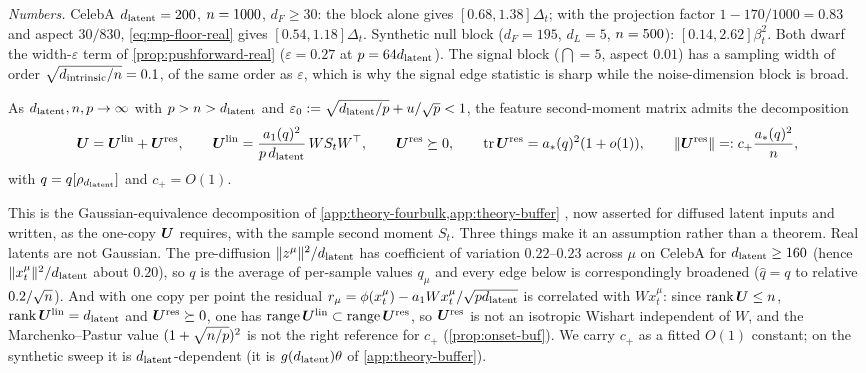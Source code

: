\emph{Numbers.} CelebA $d_{\mathrm{latent}}=200$, $n=1000$, $d_F\ge30$: the block alone gives $[0.68,1.38]\Delta_t$; with the projection factor $1-170/1000=0.83$ and aspect $30/830$, \eqref{eq:mp-floor-real} gives $[0.54,1.18]\Delta_t$. Synthetic null block ($d_F=195$, $d_L=5$, $n=500$): $[0.14,2.62]\beta_t^2$. Both dwarf the width-$\varepsilon$ term of \cref{prop:pushforward-real} ($\varepsilon=0.27$ at $p=64d_{\mathrm{latent}}$). The signal block ($\dint=5$, aspect $0.01$) has a sampling width of order $\sqrt{d_{\mathrm{intrinsic}}/n}=0.1$, of the same order as $\varepsilon$, which is why the signal edge statistic is sharp while the noise-dimension block is broad.

\begin{assumption}\label{assump:gep-real}
As $d_{\mathrm{latent}},n,p\to\infty$ with $p>n>d_{\mathrm{latent}}$ and $\varepsilon_0:=\sqrt{d_{\mathrm{latent}}/p}+u/\sqrt{p}<1$, the feature second-moment matrix admits the decomposition
\begin{equation}\label{eq:Usplit-real}
\bm{U}=\bm{U}^{\mathrm{lin}}+\bm{U}^{\mathrm{res}},\qquad
\bm{U}^{\mathrm{lin}}=\frac{a_1(q)^2}{p\,d_{\mathrm{latent}}}\,WS_tW^\top,\qquad \bm{U}^{\mathrm{res}}\succeq0,\qquad
\operatorname{tr}\bm{U}^{\mathrm{res}}=a_\ast(q)^2(1+o(1)),\qquad \|\bm{U}^{\mathrm{res}}\|=:c_+\frac{a_\ast(q)^2}{n},
\end{equation}
with $q=q[\rho_{d_{\mathrm{latent}}}]$ and $c_+=O(1)$.
\end{assumption}
This is the Gaussian-equivalence decomposition of \cref{app:theory-fourbulk,app:theory-buffer} \citep{bonnaire2025,goldt2022gaussian,hu2022universality,mei2022generalization}, now asserted for diffused latent inputs and written, as the one-copy $\bm{U}$ requires, with the sample second moment $S_t$. Three things make it an assumption rather than a theorem. Real latents are not Gaussian. The pre-diffusion $\|z^\mu\|^2/d_{\mathrm{latent}}$ has coefficient of variation $0.22$--$0.23$ across $\mu$ on CelebA for $d_{\mathrm{latent}}\ge160$ (hence $\|x_t^\mu\|^2/d_{\mathrm{latent}}$ about $0.20$), so $q$ is the average of per-sample values $q_\mu$ and every edge below is correspondingly broadened ($\hat q=q$ to relative $0.2/\sqrt{n}$). And with one copy per point the residual $r_\mu=\phi(x_t^\mu)-a_1Wx_t^\mu/\sqrt{pd_{\mathrm{latent}}}$ is correlated with $Wx_t^\mu$: since $\operatorname{rank}\bm{U}\le n$, $\operatorname{rank}\bm{U}^{\mathrm{lin}}=d_{\mathrm{latent}}$ and $\bm{U}^{\mathrm{res}}\succeq0$, one has $\operatorname{range}\bm{U}^{\mathrm{lin}}\subset\operatorname{range}\bm{U}^{\mathrm{res}}$, so $\bm{U}^{\mathrm{res}}$ is not an isotropic Wishart independent of $W$, and the Marchenko--Pastur value $(1+\sqrt{n/p})^2$ is not the right reference for $c_+$ (\cref{prop:onset-buf}). We carry $c_+$ as a fitted $O(1)$ constant; on the synthetic sweep it is $d_{\mathrm{latent}}$-dependent (it is $g(d_{\mathrm{latent}})\theta$ of \cref{app:theory-buffer}).

